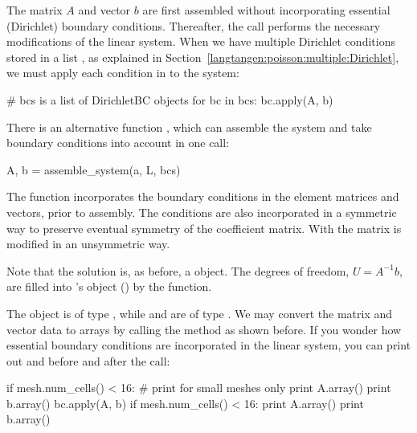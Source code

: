 The matrix $A$ and vector $b$ are first assembled without
incorporating essential (Dirichlet) boundary conditions. Thereafter,
the call  performs the necessary modifications of
the linear system.
When we have multiple Dirichlet conditions stored in a list ,
as explained in Section~\ref{langtangen:poisson:multiple:Dirichlet},
we must apply each condition in  to the system:
\begin{python}
# bcs is a list of DirichletBC objects
for bc in bcs:
    bc.apply(A, b)
\end{python}

There is an alternative function , which can
assemble the system and take boundary conditions into account in one call:
\begin{python}
A, b = assemble_system(a, L, bcs)
\end{python}
The  function incorporates the boundary conditions
in the element matrices and vectors, prior to assembly.
The conditions are also incorporated in a symmetric way to preserve
eventual symmetry of the coefficient matrix.
With 
the matrix  is modified in an unsymmetric way.

Note that the solution  is, as before, a  object.
The degrees of freedom, $U=A^{-1}b$, are filled into 's
 object () by the  function.

The object  is of type , while  and
 are of type . We may convert the matrix and
vector data to  arrays by calling the  method
as shown before. If you wonder how essential boundary conditions are
incorporated in the linear system, you can\vadjust{\vfill\pagebreak} print out  and 
before and after the  call:
\begin{python}
if mesh.num_cells() < 16:  # print for small meshes only
    print A.array()
    print b.array()
bc.apply(A, b)
if mesh.num_cells() < 16:
    print A.array()
    print b.array()
\end{python}

